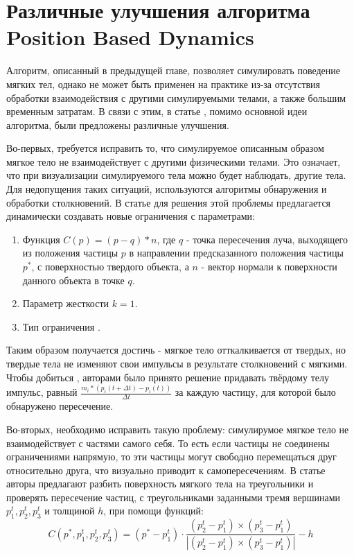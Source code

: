 \section{Различные улучшения алгоритма Position Based Dynamics} \label{ch2:pbd-improvments} %
	Алгоритм, описанный в предыдущей главе, позволяет симулировать поведение мягких тел, однако не может быть применен на практике из-за отсутствия обработки взаимодействия с другими симулируемыми телами, а также большим временным затратам. В связи с этим, в статье \cite{pbd}, помимо основной идеи алгоритма, были предложены различные улучшения.
	
	Во-первых, требуется исправить то, что симулируемое описанным образом мягкое тело не взаимодействует с другими физическими телами. Это означает, что при визуализации симулируемого тела можно будет наблюдать,  другие тела. Для недопущения таких ситуаций, используются алгоритмы обнаружения и обработки столкновений. В статье \cite{pbd} для решения этой проблемы предлагается динамически создавать новые ограничения с параметрами:
	\begin{enumerate}[1.]
		\item Функция $C(p) = (p - q) * n$, где $q$ - точка пересечения луча, выходящего из положения частицы $p$ в направлении предсказанного положения частицы $p^*$, с поверхностью твердого объекта, а $n$ - вектор нормали к поверхности данного объекта в точке $q$.
		\item Параметр жесткости $k = 1$.
		\item Тип ограничения .
	\end{enumerate}
	
	Таким образом получается достичь  - мягкое тело отткалкивается от твердых, но твердые тела не изменяют свои импульсы в результате столкновений с мягкими. Чтобы добиться , авторами было принято решение придавать твёрдому телу импульс, равный $\frac{m_i*(p_i(t + \Delta t) - p_i(t))}{\Delta t}$ за каждую частицу, для которой было обнаружено пересечение.
		
	Во-вторых, необходимо исправить такую проблему: симулирумое мягкое тело не взаимодействует с частями самого себя. То есть если частицы не соединены ограничениями напрямую, то эти частицы могут свободно перемещаться друг относительно друга, что визуально приводит к самопересечениям. В статье \cite{pbd} авторы предлагают разбить поверхность мягкого тела на треугольники и проверять пересечение частиц, с треугольниками заданными тремя вершинами $p_1^t, p_2^t, p_3^t$ и толщиной $h$, при помощи функций:
	\begin{equation}
		C(p^*, p_1^t, p_2^t, p_3^t) = (p^* - p_1^t) \cdot \frac{(p_2^t - p_1^t) \times (p_3^t - p_1^t)}{|(p_2^t - p_1^t) \times (p_3^t - p_1^t)|} - h
	\end{equation}
	
